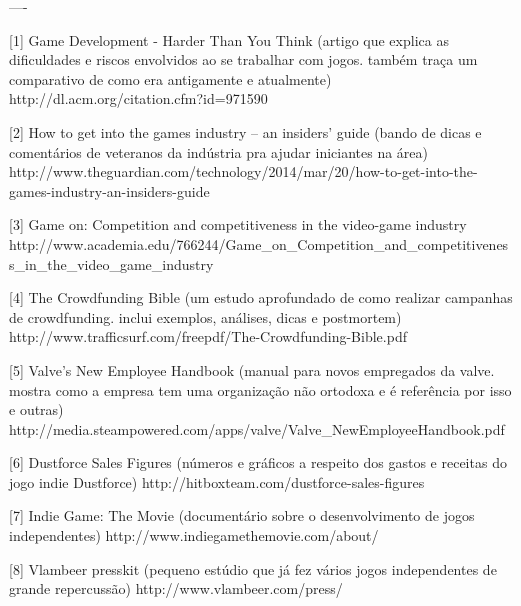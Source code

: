 ----

[1] Game Development - Harder Than You Think
(artigo que explica as dificuldades e riscos envolvidos ao se trabalhar com jogos. também traça um comparativo de como era antigamente e atualmente)
http://dl.acm.org/citation.cfm?id=971590

[2] How to get into the games industry – an insiders' guide
(bando de dicas e comentários de veteranos da indústria pra ajudar iniciantes na área)
http://www.theguardian.com/technology/2014/mar/20/how-to-get-into-the-games-industry-an-insiders-guide

[3] Game on: Competition and competitiveness in the video-game industry
http://www.academia.edu/766244/Game_on_Competition_and_competitiveness_in_the_video_game_industry

[4] The Crowdfunding Bible
(um estudo aprofundado de como realizar campanhas de crowdfunding. inclui exemplos, análises, dicas e postmortem)
http://www.trafficsurf.com/freepdf/The-Crowdfunding-Bible.pdf

[5] Valve's New Employee Handbook
(manual para novos empregados da valve. mostra como a empresa tem uma organização não ortodoxa e é referência por isso e outras)
http://media.steampowered.com/apps/valve/Valve_NewEmployeeHandbook.pdf

[6] Dustforce Sales Figures
(números e gráficos a respeito dos gastos e receitas do jogo indie Dustforce)
http://hitboxteam.com/dustforce-sales-figures

[7] Indie Game: The Movie
(documentário sobre o desenvolvimento de jogos independentes)
http://www.indiegamethemovie.com/about/

[8] Vlambeer presskit
(pequeno estúdio que já fez vários jogos independentes de grande repercussão)
http://www.vlambeer.com/press/

